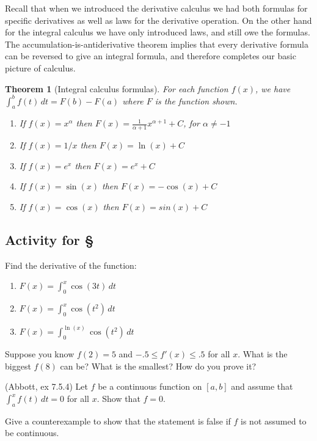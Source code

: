 \documentclass[11pt,oneside]{amsbook}
\theoremstyle{definition}
\theoremstyle{plain}
\newtheorem{theorem}{Theorem}[section]
\theoremstyle{definition}
\theoremstyle{remark}
\numberwithin{equation}{section}
\numberwithin{figure}{section}
\newcounter{activityitem}
\newenvironment{activity}{\begin{list}{\arabic{activityitem}.}{\usecounter{activityitem}\setlength{\itemsep}{.2in}}}{\end{list}}
\begin{document}
Recall that when we introduced the derivative calculus we had both formulas for specific derivatives as well as laws for the derivative operation. On the other hand for the integral calculus we have only introduced laws, and still owe the formulas. The accumulation-is-antiderivative theorem implies that every derivative formula can be reversed to give an integral formula, and therefore completes our basic picture of calculus.

\begin{theorem}[Integral calculus formulas]
  For each function $f(x)$, we have $\int_a^bf(t)\,dt=F(b)-F(a)$ where $F$ is the function shown.
  \begin{enumerate}
    \item If $f(x)=x^\alpha$ then $F(x)=\frac{1}{\alpha+1}x^{\alpha+1}+C$, for $\alpha\neq-1$
    \item If $f(x)=1/x$ then $F(x)=\ln(x)+C$
    \item If $f(x)=e^x$ then $F(x)=e^x+C$
    \item If $f(x)=\sin(x)$ then $F(x)=-\cos(x)+C$
    \item If $f(x)=\cos(x)$ then $F(x)=sin(x)+C$
  \end{enumerate}
\end{theorem}

\newpage
\subsection*{Activity for \S \thesection}

\begin{activity}
  \item Find the derivative of the function:
  \begin{enumerate}
    \item $F(x)=\int_0^x \cos(3t)\,dt$
    \item $F(x)=\int_0^x \cos(t^2)\,dt$
    \item $F(x)=\int_0^{\ln(x)} \cos(t^2)\,dt$
  \end{enumerate}
  \item Suppose you know $f(2)=5$ and $-.5\leq f'(x)\leq.5$ for all $x$. What is the biggest $f(8)$ can be? What is the smallest? How do you prove it?
  \item (Abbott, ex 7.5.4) Let $f$ be a continuous function on $[a,b]$ and assume that $\int_a^xf(t)\,dt=0$ for all $x$. Show that $f=0$.

   Give a counterexample to show that the statement is false if $f$ is not assumed to be continuous.
\end{activity}
\end{document}
